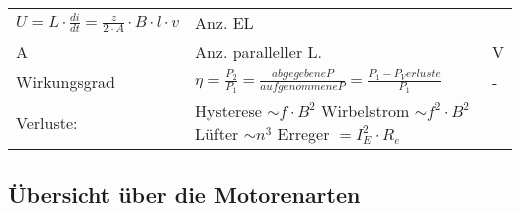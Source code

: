 \begin{tabular}[c]{ | p{5cm} | p{8cm} | p{4cm} | }
            \renewcommand{\arraystretch}{1}
            $U = L \cdot \frac{di}{dt}= \frac{z}{2\cdot A} \cdot B \cdot l \cdot v$ \quad 
            \begin{array}[t]{ll}
                z & Anz. EL \\
                A & Anz. paralleller L.
            \end{array}
            \renewcommand{\arraystretch}{2}
            &
            V \\
            \hline
            Wirkungsgrad &
            $\eta = \frac{P_2}{P_1}=\frac{abgegebene P}{aufgenommene P}= \frac{P_1 - P_Verluste}{P_1}$ &
            - \\
            \hline
            Verluste: &
            Hysterese $\sim f \cdot B^2$ \qquad Wirbelstrom $\sim f^2 \cdot B^2$ \qquad Lüfter $ \sim n^3$ \qquad\qquad Erreger $ = I_E ^2 \cdot R_e $ &
            \\
            \hline
        \end{tabular}
        \renewcommand{\arraystretch}{1.5}	
        
        \subsection{Übersicht über die Motorenarten}
